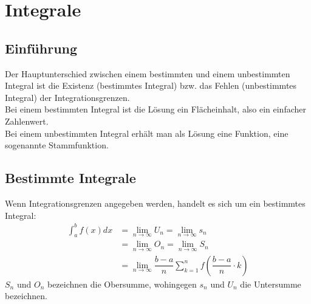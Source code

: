 \chapter{Integrale}
\section{Einführung}
Der Hauptunterschied zwischen einem bestimmten und einem unbestimmten Integral ist die Existenz (bestimmtes Integral) bzw. das Fehlen
(unbestimmtes Integral) der Integrationsgrenzen.\\
Bei einem bestimmten Integral ist die Lösung ein Flächeinhalt, also ein einfacher Zahlenwert.\\
Bei einem unbestimmten Integral erhält man als Lösung eine Funktion, eine sogenannte Stammfunktion.\\


\section{Bestimmte Integrale}
\begin{Definition}
  Wenn Integrationsgrenzen angegeben werden, handelt es sich um ein bestimmtes Integral:
  \begin{align*}
    \int_{a}^{b} f(x)dx & = \lim\limits_{n \rightarrow \infty} U_n = \lim\limits_{n \rightarrow \infty} s_n\\
                        & = \lim\limits_{n \rightarrow \infty} O_n = \lim\limits_{n \rightarrow \infty} S_n\\
                        & = \lim\limits_{n \rightarrow \infty} \dfrac{b-a}{n}\sum\limits_{k=1}^{n}f\left(\dfrac{b-a}{n}\cdot k\right)
  \end{align*}
  $S_n$ und $O_n$ bezeichnen die Obersumme, wohingegen $s_n$ und $U_n$ die Untersumme bezeichnen.
\end{Definition}

